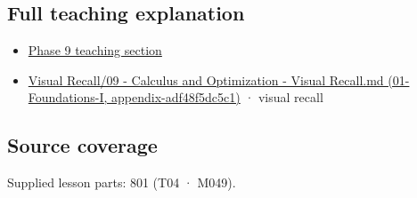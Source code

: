 \subsection{Full teaching explanation}\label{full-teaching-explanation}

\begin{itemize}
\tightlist
\item
  \href{Continuous\%20Notes/Computing\%20Foundations\%20-\%20From\%20Bits\%20to\%20C++\%20and\%20Systems\%20APIs\#Functions,\%20limits,\%20continuity,\%20and\%20scalar\%20change}{Phase 9 teaching section}
\item
  \href{}{Visual Recall/09 - Calculus and Optimization - Visual Recall.md (01-Foundations-I, appendix-adf48f5dc5c1)} · visual recall
\end{itemize}

\subsection{Source coverage}\label{source-coverage}

Supplied lesson parts: 801 (T04 · M049).
